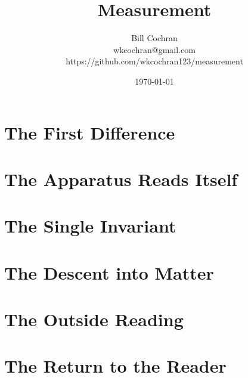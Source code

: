 \documentclass[12pt,oneside]{book}
\begin{document}
\title{Measurement}
\author{Bill Cochran\\wkcochran@gmail.com\\https://github.com/wkcochran123/measurement}
\date{\today}
\maketitle

\frontmatter
\onehalfspacing
\tableofcontents


\mainmatter
\part{The First Difference}




\part{The Apparatus Reads Itself}




\part{The Single Invariant}





\part{The Descent into Matter}









\part{The Outside Reading}






\part{The Return to the Reader}




\cleardoublepage

\backmatter
\end{document}
